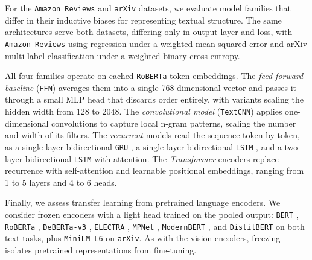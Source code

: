For the \texttt{Amazon Reviews} and \texttt{arXiv} datasets, we evaluate model families that differ in their inductive biases for representing textual structure. The same architectures serve both datasets, differing only in output layer and loss, with \texttt{Amazon Reviews} using regression under a weighted mean squared error and arXiv multi-label classification under a weighted binary cross-entropy.

All four families operate on cached \texttt{RoBERTa} token embeddings. The \emph{feed-forward baseline} (\texttt{FFN}) averages them into a single 768-dimensional vector and passes it through a small MLP head that discards order entirely, with variants scaling the hidden width from 128 to 2048. The \emph{convolutional model} (\texttt{TextCNN}) \cite{kim2014convolutional} applies one-dimensional convolutions to capture local n-gram patterns, scaling the number and width of its filters. The \emph{recurrent} models read the sequence token by token, as a single-layer bidirectional \texttt{GRU} \cite{cho2014learning}, a single-layer bidirectional \texttt{LSTM} \cite{hochreiter1997long}, and a two-layer bidirectional \texttt{LSTM} with attention. The \emph{Transformer} encoders replace recurrence with self-attention \cite{vaswani2017attention} and learnable positional embeddings, ranging from 1 to 5 layers and 4 to 6 heads.

\iflncs\noindent\fi Finally, we assess transfer learning from pretrained language encoders. We consider frozen encoders with a light head trained on the pooled output: \texttt{BERT} \cite{devlin2019bert}, \texttt{RoBERTa} \cite{liu2019roberta}, \texttt{DeBERTa-v3} \cite{he2023debertav3}, \texttt{ELECTRA} \cite{clark2020electra}, \texttt{MPNet} \cite{song2020mpnet}, \texttt{ModernBERT} \cite{warner2024modernbert}, and \texttt{DistilBERT} \cite{sanh2019distilbert} on both text tasks, plus \texttt{MiniLM-L6} \cite{wang2020minilm} on \texttt{arXiv}. As with the vision encoders, freezing isolates pretrained representations from fine-tuning.
